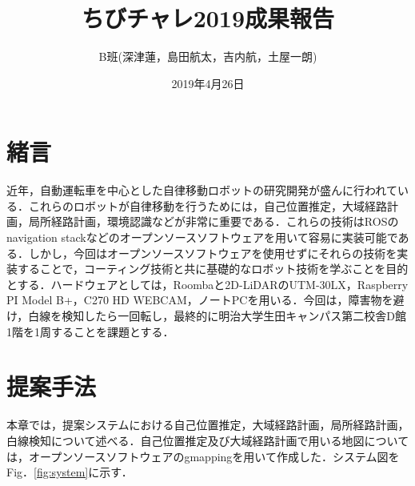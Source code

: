 \documentclass{jarticle}
\begin{document}
\title{ちびチャレ2019成果報告}
\author{B班(深津蓮，島田航太，吉内航，土屋一朗)}
\date{2019年4月26日}
\maketitle

\section{緒言}
近年，自動運転車を中心とした自律移動ロボットの研究開発が盛んに行われている．これらのロボットが自律移動を行うためには，自己位置推定，大域経路計画，局所経路計画，環境認識などが非常に重要である．これらの技術はROSのnavigation stack\cite{ns}などのオープンソースソフトウェアを用いて容易に実装可能である．しかし，今回はオープンソースソフトウェアを使用せずにそれらの技術を実装することで，コーティング技術と共に基礎的なロボット技術を学ぶことを目的とする．ハードウェアとしては，Roomba\cite{roomba}と2D-LiDARのUTM-30LX\cite{lrf}，Raspberry PI Model B+\cite{raspi}，C270 HD WEBCAM\cite{webcam}，ノートPCを用いる．今回は，障害物を避け，白線を検知したら一回転し，最終的に明治大学生田キャンパス第二校舎D館1階を1周することを課題とする．
\section{提案手法}
本章では，提案システムにおける自己位置推定，大域経路計画，局所経路計画，白線検知について述べる．自己位置推定及び大域経路計画で用いる地図については，オープンソースソフトウェアのgmapping\cite{gmapping}を用いて作成した．システム図をFig．\ref{fig:system}に示す．
\end{document}
